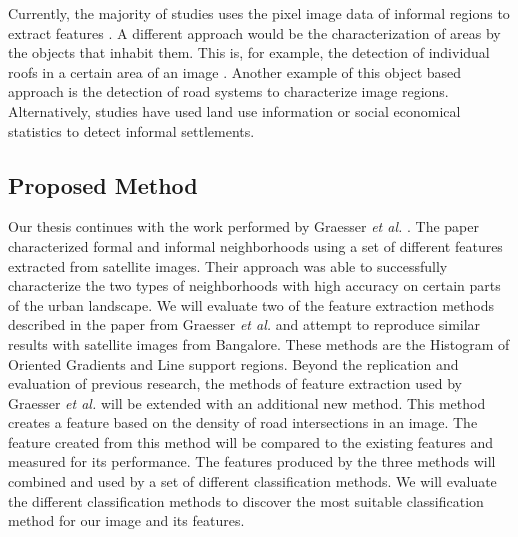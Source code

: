 Currently, the majority of studies uses the pixel image data of informal regions to extract features \cite{kuffer2016slums}. A different approach would be the characterization of areas by the objects that inhabit them. This is, for example, the detection of individual roofs in a certain area  of an image \cite{williams2016automatic}. Another example of this object based approach is the detection of road systems to characterize image regions. Alternatively, studies have used land use information \cite{novack2010urban} or social economical statistics \cite{engstrom2011using} to detect informal settlements.



 
\subsection{Proposed Method}

Our thesis continues with the work performed by Graesser \textit{et al.} \cite{graesser2012image}. The paper characterized formal and informal neighborhoods using a set of different features extracted from satellite images. Their approach was able to successfully characterize the two types of neighborhoods with high accuracy on certain parts of the urban landscape. We will evaluate two of the feature extraction methods described in the paper from Graesser \textit{et al.} and attempt to reproduce similar results with satellite images from Bangalore. These methods are the Histogram of Oriented Gradients and Line support regions. Beyond the replication and evaluation of previous research, the methods of feature extraction used by Graesser \textit{et al.} will be extended with an additional new method. This method creates a feature based on the density of road intersections in an image. The feature created from this method will be compared to the existing features and measured for its performance. The features produced by the three methods will combined and used by a set of different classification methods.
We will evaluate the different classification methods to discover the most suitable classification method for our image and its features. 



